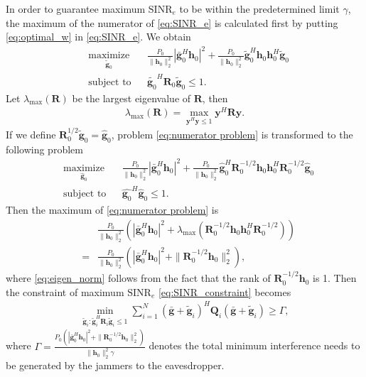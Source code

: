 \documentclass[12pt, journal,onecolumn,draftclsnofoot]{IEEEtran}
\begin{document}
In order to guarantee maximum $\mathrm{SINR}_e$ to be within the predetermined limit $\gamma$, the maximum of the numerator of \eqref{eq:SINR_e} is calculated first by putting \eqref{eq:optimal_w} in \eqref{eq:SINR_e}. We obtain
\begin{equation}
\begin{aligned} \label{eq:numerator problem}
& \underset{\tilde{\mathbf{g}}_{0}}{\text{maximize}}
& & \frac{P_0}{\|\mathbf{h}_0\|_2^2}|\bar{\mathbf{g}}_0^H\mathbf{h}_0|^2 +\frac{P_0}{\|\mathbf{h}_0\|_2^2} \tilde{\mathbf{g}}_0^H\mathbf{h}_0\mathbf{h}_0^H\tilde{\mathbf{g}}_0 \\
& \text{subject to}
& & \tilde{\mathbf{g}_0}^H\mathbf{R}_0\tilde{\mathbf{g}}_0 \leq 1.
\end{aligned}
\end{equation}
Let $\lambda_{\mathrm{max}}(\mathbf{R})$ be the largest eigenvalue of $\mathbf{R}$, then
\begin{eqnarray}
\lambda_{\mathrm{max}}(\mathbf{R})= \max_{\mathbf{y}^H\mathbf{y} \leq 1} \mathbf{y}^H\mathbf{R}\mathbf{y}.
\end{eqnarray}
If we define $\mathbf{R}_0^{1/2}\tilde{\mathbf{g}}_0 = \hat{\mathbf{g}}_0$, problem \eqref{eq:numerator problem} is transformed to the following problem
\begin{equation}
\begin{aligned} \label{eq:numerator problem1}
& \underset{\hat{\mathbf{g}}_{0}}{\text{maximize}}
& & \frac{P_0}{\|\mathbf{h}_0\|_2^2}|\bar{\mathbf{g}}_0^H\mathbf{h}_0|^2 +\frac{P_0}{\|\mathbf{h}_0\|_2^2} \hat{\mathbf{g}}_0^H\mathbf{R}_0^{-1/2}\mathbf{h}_0\mathbf{h}_0^H\mathbf{R}_0^{-1/2}\hat{\mathbf{g}}_0 \\
& \text{subject to}
& & \hat{\mathbf{g}_0}^H\hat{\mathbf{g}}_0 \leq 1.
\end{aligned}
\end{equation}
Then the maximum of \eqref{eq:numerator problem} is
\begin{eqnarray}
&&\frac{P_0}{\|\mathbf{h}_0\|_2^2}\left(|\bar{\mathbf{g}}_0^H\mathbf{h}_0|^2 + \lambda_{\mathrm{max}}(\mathbf{R}_0^{-1/2}\mathbf{h}_0\mathbf{h}_0^H\mathbf{R}_0^{-1/2})\right)\\
&=&\frac{P_0}{\|\mathbf{h}_0\|_2^2}\left(|\bar{\mathbf{g}}_0^H\mathbf{h}_0|^2 + \|\mathbf{R}_0^{-1/2}\mathbf{h}_0\|_2^2\right)\label{eq:eigen_norm},
\end{eqnarray} 
where \eqref{eq:eigen_norm} follows from the fact that the rank of $\mathbf{R}_0^{-1/2}\mathbf{h}_0$ is 1. Then the constraint of maximum $\mathrm{SINR}_e$ \eqref{eq:SINR_constraint}  becomes
\begin{eqnarray}
\min_{\tilde{\mathbf{g}}_i: \tilde{\mathbf{g}}_i^H \mathbf{R}_i\tilde{\mathbf{g}}_i \leq 1}\sum_{i=1}^{N}(\bar{\mathbf{g}}+\tilde{\mathbf{g}}_i)^H\mathbf{Q}_i(\bar{\mathbf{g}}+\tilde{\mathbf{g}}_i) \geq \Gamma  \label{eq:artificial noise constraint},
\end{eqnarray}
where $\Gamma =\frac{P_0\left(|\bar{\mathbf{g}}_0^H\mathbf{h}_0|^2 + \|\mathbf{R}_0^{-1/2}\mathbf{h}_0\|_2^2\right)}{\|\mathbf{h}_0\|_2^2\gamma}$ denotes the total minimum interference needs to be generated by the jammers to the eavesdropper.
\end{document}
